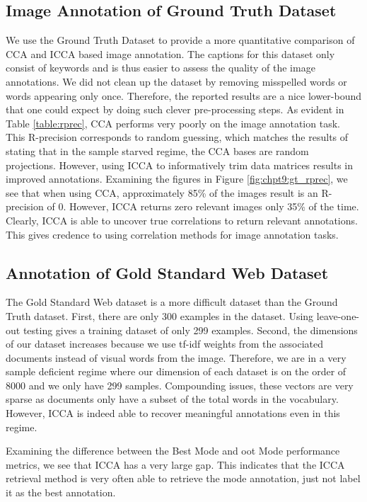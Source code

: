 \subsection{Image Annotation of Ground Truth Dataset}

We use the Ground Truth Dataset to provide a more quantitative comparison of CCA and ICCA
based image annotation. The captions for this dataset only consist of keywords and is
thus easier to assess the quality of the image annotations. We did not clean up the
dataset by removing misspelled words or words appearing only once. Therefore, the reported
results are a nice lower-bound that one could expect by doing such clever pre-processing
steps. As evident in Table \ref{table:rprec}, CCA performs very poorly on the image
annotation task. This R-precision corresponds to random guessing, which matches the
results of \cite{pezeshki2004empirical} stating that in the sample starved regime, the CCA
bases are random projections. However, using ICCA to informatively trim data matrices
results in improved annotations. Examining the figures in Figure \ref{fig:chpt9:gt_rprec}, we
see that when using CCA, approximately 85\% of the images result is an R-precision of
0. However, ICCA returns zero relevant images only 35\% of the time. Clearly, ICCA is able
to uncover true correlations to return relevant annotations. This gives credence to using
correlation methods for image annotation tasks.

\subsection{Annotation of Gold Standard Web Dataset}

The Gold Standard Web dataset is a more difficult dataset than the Ground Truth
dataset. First, there are only 300 examples in the dataset. Using leave-one-out testing
gives a training dataset of only 299 examples. Second, the dimensions of our dataset
increases because we use tf-idf weights from the associated documents instead of visual
words from the image. Therefore, we are in a very sample deficient regime where our
dimension of each dataset is on the order of 8000 and we only have 299
samples. Compounding issues, these vectors are very sparse as documents only have a subset
of the total words in the vocabulary. However, ICCA is indeed able to recover meaningful
annotations even in this regime.

Examining the difference between the Best Mode and oot Mode performance metrics, we see
that ICCA has a very large gap. This indicates that the ICCA retrieval method is very
often able to retrieve the mode annotation, just not label it as the best annotation. 

